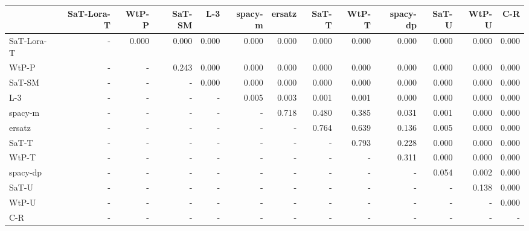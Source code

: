\begin{tabular}{lrrrrrrrrrrrr}
\toprule
 & SaT-Lora-T & WtP-P & SaT-SM & L-3 & spacy-m & ersatz & SaT-T & WtP-T & spacy-dp & SaT-U & WtP-U & C-R \\
\midrule
SaT-Lora-T & - & 0.000 & 0.000 & 0.000 & 0.000 & 0.000 & 0.000 & 0.000 & 0.000 & 0.000 & 0.000 & 0.000 \\
WtP-P & - & - & 0.243 & 0.000 & 0.000 & 0.000 & 0.000 & 0.000 & 0.000 & 0.000 & 0.000 & 0.000 \\
SaT-SM & - & - & - & 0.000 & 0.000 & 0.000 & 0.000 & 0.000 & 0.000 & 0.000 & 0.000 & 0.000 \\
L-3 & - & - & - & - & 0.005 & 0.003 & 0.001 & 0.001 & 0.000 & 0.000 & 0.000 & 0.000 \\
spacy-m & - & - & - & - & - & 0.718 & 0.480 & 0.385 & 0.031 & 0.001 & 0.000 & 0.000 \\
ersatz & - & - & - & - & - & - & 0.764 & 0.639 & 0.136 & 0.005 & 0.000 & 0.000 \\
SaT-T & - & - & - & - & - & - & - & 0.793 & 0.228 & 0.000 & 0.000 & 0.000 \\
WtP-T & - & - & - & - & - & - & - & - & 0.311 & 0.000 & 0.000 & 0.000 \\
spacy-dp & - & - & - & - & - & - & - & - & - & 0.054 & 0.002 & 0.000 \\
SaT-U & - & - & - & - & - & - & - & - & - & - & 0.138 & 0.000 \\
WtP-U & - & - & - & - & - & - & - & - & - & - & - & 0.000 \\
C-R & - & - & - & - & - & - & - & - & - & - & - & - \\
\bottomrule
\end{tabular}

